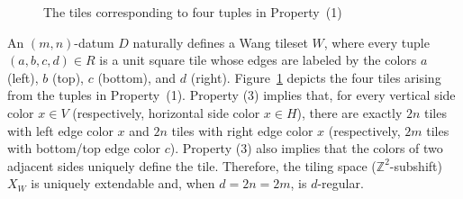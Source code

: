 \documentclass[12pt]{article}
\theoremstyle{definition}
\begin{document}
\begin{figure}[t]
\begin{center}
\qquad\quad
{}\qquad\quad
{}\qquad\quad
{}
\end{center}
\caption{The tiles corresponding to four tuples in Property~(1)}\label{fig:Tiles_4tuples_(1)}
\end{figure}

An $(m,n)$-datum $D$ naturally defines a Wang tileset $W$, where every tuple $(a,b,c,d)\in R$ is a unit square tile whose edges are labeled by the colors $a$ (left), $b$ (top), $c$ (bottom), and $d$ (right). Figure~\ref{fig:Tiles_4tuples_(1)} depicts the four tiles arising from the tuples in Property~(1). Property (3) implies that, for every vertical side color $x\in V$ (respectively, horizontal side color $x\in H$), there are exactly $2n$ tiles with left edge color $x$ and $2n$ tiles with right edge color $x$ (respectively, $2m$ tiles with bottom/top edge color $c$). Property (3) also implies that the colors of two adjacent sides uniquely define the tile. Therefore, the tiling space ($\mathbb{Z}^2$-subshift) $X_W$ is uniquely extendable and, when $d=2n=2m$, is $d$-regular.
\end{document}
